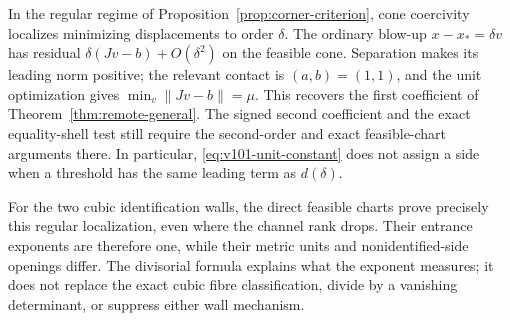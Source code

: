 In the regular regime of Proposition~\ref{prop:corner-criterion},
cone coercivity localizes minimizing displacements to order $\delta$.
The ordinary blow-up $x-x_*=\delta v$ has residual
$\delta(Jv-b)+O(\delta^2)$ on the feasible cone. Separation makes its
leading norm positive; the relevant contact is $(a,b)=(1,1)$, and the
unit optimization gives $\min_v\|Jv-b\|=\mu$. This recovers the first
coefficient of Theorem~\ref{thm:remote-general}. The signed second
coefficient and the exact equality-shell test still require the
second-order and exact feasible-chart arguments there. In particular,
\eqref{eq:v101-unit-constant} does not assign a side when a threshold
has the same leading term as $d(\delta)$.

For the two cubic identification walls, the direct feasible charts
prove precisely this regular localization, even where the channel
rank drops. Their entrance exponents are therefore one, while their
metric units and nonidentified-side openings differ. The divisorial
formula explains what the exponent measures; it does not replace the
exact cubic fibre classification, divide by a vanishing determinant,
or suppress either wall mechanism.
